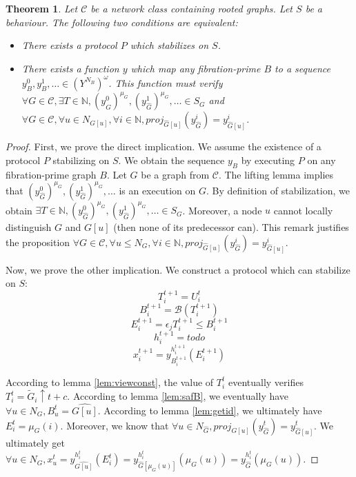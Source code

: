 \documentclass[11pt,letterpaper]{article}
\newtheorem{thm}{Theorem}
\begin{document}
\begin{thm}
	Let $\mathcal{C}$ be a network class containing rooted graphs.
	Let $S$ be a behaviour.
	The following two conditions are equivalent:
	\begin{itemize}
		\item There exists a protocol $P$ which stabilizes on $S$.
		\item There exists a function $y$ which map any fibration-prime $B$ to a sequence $y_B^0, y_B^1, \dots \in (Y^{N_B})^\omega$.
			This function must verify $\forall G \in \mathcal{C}, \exists T \in \mathds{N}, (y_{\hat G}^0)^{\mu_G}, (y_{\hat G}^1)^{\mu_G}, \dots \in S_G$
			and $\forall G \in \mathcal{C}, \forall u \in N_{G[u]}, \forall i \in \mathds{N}, proj_{\hat G[u]}(y^i_{\hat G}) = y^i_{\hat G[u]}$.
	\end{itemize}
\end{thm}
\begin{proof}
	First, we prove the direct implication. We assume the existence of a protocol $P$ stabilizing on $S$.
	We obtain the sequence $y_B$ by executing $P$ on any fibration-prime graph $B$.
	Let $G$ be a graph from $\mathcal{C}$.
	The lifting lemma implies that $(y_{\hat G}^0)^{\mu_G}, (y_{\hat G}^1)^{\mu_G}, \dots$ is an execution on $G$.
	By definition of stabilization, we obtain $\exists T \in \mathds{N}, (y_{\hat G}^0)^{\mu_G}, (y_{\hat G}^1)^{\mu_G}, \dots \in S_G$.
	Moreover, a node $u$ cannot locally distinguish $G$ and $G[u]$ (then none of its predecessor can). This remark justifies the proposition
	$\forall G \in \mathcal{C}, \forall u \leq N_G, \forall i \in \mathds{N}, proj_{\hat G[u]}(y^i_{\hat G}) = y^i_{\hat G[u]}$.

	Now, we prove the other implication. We construct a protocol which can stabilize on $S$:
	$$T_i^{t+1} = U_i^t$$
	$$B_i^{t+1} = \mathcal{B}(T_i^{t+1})$$
	$$E_i^{t+1} = \epsilon_j T_i^{t+1} \leq B_i^{t+1}$$
	$$h_i^{t+1} = todo$$
	$$x_i^{t+1} = y_{B_i^{t+1}}^{h_i^{t+1}}(E_i^{t+1})$$

	According to lemma \ref{lem:viewconst}, the value of $T_i^t$ eventually verifies $T_i^t = \tilde{G}_i \uparrow t+c$.
	According to lemma \ref{lem:safB}, we eventually have $\forall u \in N_G, B_u^t = \widehat{G[u]}$.
	According to lemma \ref{lem:getid}, we ultimately have $E_i^t = \mu_G(i)$.
	Moreover, we know that $\forall u \in N_{\hat G}, proj_{G[u]}(y^t_{\hat G}) = y^t_{\hat G[u]}$.
	We ultimately get $\forall u \in N_G, x_u^t = y_{\widehat{G[u]}}^{h_i^t}(E_i^t) = y_{\hat G[\mu_G(u)]}^{h_i^t}(\mu_G(u)) = y^{h_i^t}_{\hat G}(\mu_G(u))$.
\end{proof}
\end{document}
